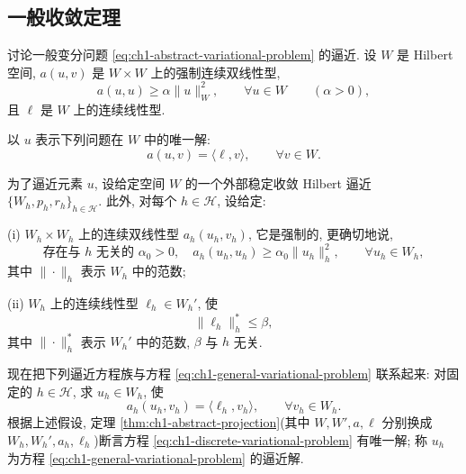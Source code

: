 \subsection{一般收敛定理}
\label{subsec:ch1-general-convergence-theorem}

讨论一般变分问题 \eqref{eq:ch1-abstract-variational-problem} 的逼近. 设 $W$ 是 Hilbert 空间, $a(u,v)$ 是 $W\times W$ 上的强制连续双线性型,
\begin{equation}
a(u,u)\geq\alpha\|u\|_W^2,\qquad\forall u\in W\qquad(\alpha>0),
\label{eq:ch1-general-coercivity}
\end{equation}
且 $\ell$ 是 $W$ 上的连续线性型.

以 $u$ 表示下列问题在 $W$ 中的唯一解:
\begin{equation}
a(u,v)=\langle\ell,v\rangle,\qquad\forall v\in W.
\label{eq:ch1-general-variational-problem}
\end{equation}

为了逼近元素 $u$, 设给定空间 $W$ 的一个外部稳定收敛 Hilbert 逼近 $\{W_h,p_h,r_h\}_{h\in\mathcal H}$. 此外, 对每个 $h\in\mathcal H$, 设给定:

(i) $W_h\times W_h$ 上的连续双线性型 $a_h(u_h,v_h)$, 它是强制的, 更确切地说,
\begin{equation}
\text{存在与 }h\text{ 无关的 }\alpha_0>0,\quad
a_h(u_h,u_h)\geq\alpha_0\|u_h\|_h^2,\qquad\forall u_h\in W_h,
\label{eq:ch1-discrete-coercivity}
\end{equation}
其中 $\|\cdot\|_h$ 表示 $W_h$ 中的范数;

(ii) $W_h$ 上的连续线性型 $\ell_h\in W_h'$, 使
\begin{equation}
\|\ell_h\|_h^\ast\leq\beta,
\label{eq:ch1-discrete-functional-bound}
\end{equation}
其中 $\|\cdot\|_h^\ast$ 表示 $W_h'$ 中的范数, $\beta$ 与 $h$ 无关.

现在把下列逼近方程族与方程 \eqref{eq:ch1-general-variational-problem} 联系起来: 对固定的 $h\in\mathcal H$, 求 $u_h\in W_h$, 使
\begin{equation}
a_h(u_h,v_h)=\langle\ell_h,v_h\rangle,\qquad\forall v_h\in W_h.
\label{eq:ch1-discrete-variational-problem}
\end{equation}
根据上述假设, 定理 \ref{thm:ch1-abstract-projection}(其中 $W,W',a,\ell$ 分别换成 $W_h,W_h',a_h,\ell_h$)断言方程 \eqref{eq:ch1-discrete-variational-problem} 有唯一解; 称 $u_h$ 为方程 \eqref{eq:ch1-general-variational-problem} 的逼近解.

